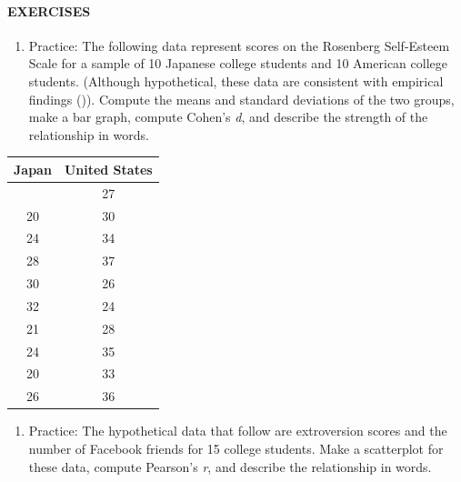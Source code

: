 \documentclass[
]{krantz}
\providecommand{\tightlist}{%
  \setlength{\itemsep}{0pt}\setlength{\parskip}{0pt}}
\begin{document}
\paragraph*{EXERCISES}\label{exercises-27}

\begin{enumerate}
\def\labelenumi{\arabic{enumi}.}
\tightlist
\item
  Practice: The following data represent scores on the Rosenberg Self-Esteem Scale for a sample of 10 Japanese college students and 10 American college students. (Although hypothetical, these data are consistent with empirical findings ()). Compute the means and standard deviations of the two groups, make a bar graph, compute Cohen's \emph{d}, and describe the strength of the relationship in words.
\end{enumerate}

\begin{longtable}[]{@{}cc@{}}
\toprule\noalign{}
Japan & United States \\
\midrule\noalign{}
\endhead
\bottomrule\noalign{}
\endlastfoot
25 & 27 \\
20 & 30 \\
24 & 34 \\
28 & 37 \\
30 & 26 \\
32 & 24 \\
21 & 28 \\
24 & 35 \\
20 & 33 \\
26 & 36 \\
\end{longtable}

\begin{enumerate}
\def\labelenumi{\arabic{enumi}.}
\setcounter{enumi}{1}
\tightlist
\item
  Practice: The hypothetical data that follow are extroversion scores and the number of Facebook friends for 15 college students. Make a scatterplot for these data, compute Pearson's \emph{r}, and describe the relationship in words.
\end{enumerate}
\end{document}
